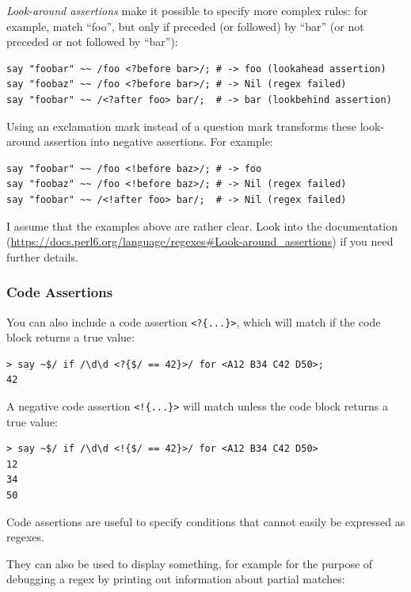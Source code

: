 \emph{Look-around assertions} make it possible to 
specify more complex rules: for example, match ``foo'', 
but only if preceded (or followed) by ``bar'' (or not 
preceded or not followed by ``bar''):

\begin{verbatim}
say "foobar" ~~ /foo <?before bar>/; # -> foo (lookahead assertion)
say "foobaz" ~~ /foo <?before bar>/; # -> Nil (regex failed)
say "foobar" ~~ /<?after foo> bar/;  # -> bar (lookbehind assertion)
\end{verbatim}
%
Using an exclamation mark instead of a question mark transforms 
these look-around assertion into negative assertions. For example:

\begin{verbatim}
say "foobar" ~~ /foo <!before baz>/; # -> foo 
say "foobaz" ~~ /foo <!before baz>/; # -> Nil (regex failed)
say "foobar" ~~ /<!after foo> bar/;  # -> Nil (regex failed)
\end{verbatim}
%
I assume that the examples above are rather clear. Look into the 
documentation 
(\url{https://docs.perl6.org/language/regexes#Look-around_assertions}) 
if you need further details. 

\subsubsection{Code Assertions}

You can also include a code assertion \verb'<?{...}>', which 
will match if the code block returns a true value:

\begin{verbatim}
> say ~$/ if /\d\d <?{$/ == 42}>/ for <A12 B34 C42 D50>;
42
\end{verbatim}

A negative code assertion \verb'<!{...}>' will 
match unless the code block returns a true value:
\begin{verbatim}
> say ~$/ if /\d\d <!{$/ == 42}>/ for <A12 B34 C42 D50>
12
34
50
\end{verbatim}

Code assertions are useful to specify conditions that 
cannot easily be expressed as regexes. 

They can also be used to display something, for example 
for the purpose of debugging a regex by printing out 
information about partial matches:

